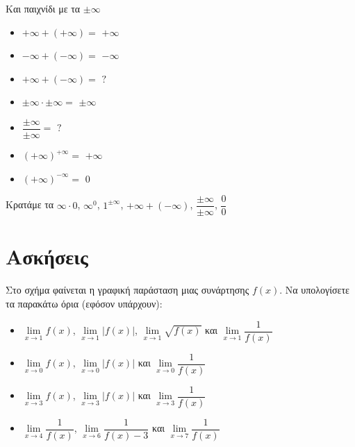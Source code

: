 \documentclass{presentation}
\begin{document}
\begin{frame}{Και παιχνίδι με τα $\pm\infty$}
  \begin{multicols}{2}
    \begin{itemize}
      \item $+\infty + (+\infty)=$ \pause $+\infty$ \pause
      \item $-\infty + (-\infty)=$ \pause $-\infty$ \pause
      \item $+\infty + (-\infty)=$ \pause $?$ \pause
      \item $\pm\infty \cdot \pm\infty=$ \pause $\pm\infty$ \pause
      \item $\dfrac{\pm\infty}{\pm\infty}=$ \pause $?$ \pause
      \item $(+\infty)^{+\infty}=$ \pause $+\infty$ \pause
      \item $(+\infty)^{-\infty}=$ \pause $0$
    \end{itemize}
  \end{multicols}
  Κρατάμε τα $\infty\cdot 0$, $\infty^0$, $1^{\pm\infty}$, $+\infty + (-\infty)$, $\dfrac{\pm\infty}{\pm\infty}$, $\dfrac{0}{0}$
\end{frame}

\section{Ασκήσεις}
\begin{askisi}
  Στο σχήμα
  \href{https://www.geogebra.org/m/xzc6usbm}{}
  φαίνεται η γραφική παράσταση μιας συνάρτησης $f(x)$. Να υπολογίσετε τα παρακάτω όρια (εφόσον υπάρχουν):
  \begin{itemize}
    \item $\lim\limits_{x \to 1}{ f(x) }$, $\lim\limits_{x \to 1}{ |f(x)| }$, $\lim\limits_{x \to 1}{ \sqrt{f(x)} }$ και $\lim\limits_{x \to 1}{ \dfrac{1}{f(x)} }$ \pause
    \item $\lim\limits_{x \to 0}{ f(x) }$, $\lim\limits_{x \to 0}{ |f(x)| }$ και $\lim\limits_{x \to 0}{ \dfrac{1}{f(x)} }$ \pause
    \item $\lim\limits_{x \to 3}{ f(x) }$, $\lim\limits_{x \to 3}{ |f(x)| }$ και $\lim\limits_{x \to 3}{ \dfrac{1}{f(x)} }$ \pause
    \item $\lim\limits_{x \to 4}{ \dfrac{1}{f(x)} }$, $\lim\limits_{x \to 6}{ \dfrac{1}{f(x)-3} }$ και $\lim\limits_{x \to 7}{ \dfrac{1}{f(x)} }$
  \end{itemize}
\end{askisi}
\end{document}
